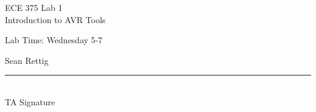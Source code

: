 \documentclass[12pt,letterpaper]{article}
\begin{document}
\begin{titlepage}
    \vspace*{4cm}
    \begin{flushright}
    {\huge
        ECE 375 Lab 1\\[1cm]
    }
    {\large
        Introduction to AVR Tools
    }
    \end{flushright}
    \begin{flushleft}
    Lab Time: Wednesday 5-7
    \end{flushleft}
    \begin{flushright}
    Sean Rettig
    \vfill
    \rule{5in}{.5mm}\\
    TA Signature
    \end{flushright}

\end{titlepage}
\end{document}
